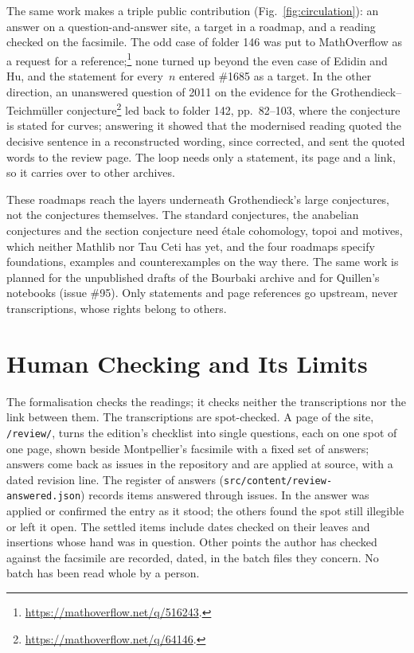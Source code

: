 \documentclass[runningheads,a4paper]{llncs}
\begin{document}


The same work makes a triple public contribution (Fig.~\ref{fig:circulation}): an answer on a question-and-answer site, a target in a roadmap, and a reading checked on the facsimile. The odd case of folder 146 was put to MathOverflow as a request for a reference;\footnote{\url{https://mathoverflow.net/q/516243}.} none turned up beyond the even case of Edidin and Hu, and the statement for every~$n$ entered \#1685 as a target. In the other direction, an unanswered question of 2011 on the evidence for the Grothendieck--Teichmüller conjecture\footnote{\url{https://mathoverflow.net/q/64146}.} led back to folder 142, pp.~82--103, where the conjecture is stated for curves; answering it showed that the modernised reading quoted the decisive sentence in a reconstructed wording, since corrected, and sent the quoted words to the review page. The loop needs only a statement, its page and a link, so it carries over to other archives.

These roadmaps reach the layers underneath Grothendieck's large conjectures, not the conjectures themselves. The standard conjectures, the anabelian conjectures and the section conjecture need étale cohomology, topoi and motives, which neither Mathlib nor Tau Ceti has yet, and the four roadmaps specify foundations, examples and counterexamples on the way there. The same work is planned for the unpublished drafts of the Bourbaki archive and for Quillen's notebooks (issue \#95). Only statements and page references go upstream, never transcriptions, whose rights belong to others.

\section{Human Checking and Its Limits}\label{sec:checking}

The formalisation checks the readings; it checks neither the transcriptions nor the link between them. The transcriptions are spot-checked. A page of the site, \texttt{/review/}, turns the edition's checklist into single questions, each on one spot of one page, shown beside Montpellier's facsimile with a fixed set of answers; answers come back as issues in the repository and are applied at source, with a dated revision line. The register of answers (\nolinkurl{src/content/review-answered.json}) records \cntReviewItems{} items answered through \cntReviewIssues{} issues. In \cntReviewSettled{} the answer was applied or confirmed the entry as it stood; the others found the spot still illegible or left it open. The settled items include \cntReviewDates{} dates checked on their leaves and \cntReviewInsertions{} insertions whose hand was in question. Other points the author has checked against the facsimile are recorded, dated, in the batch files they concern. No batch has been read whole by a person.
\end{document}
